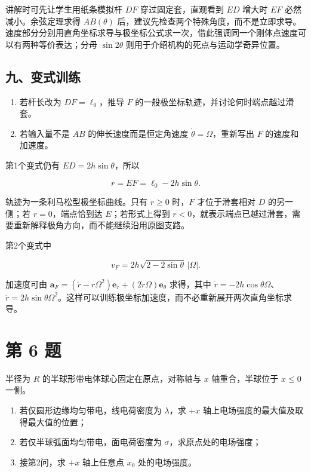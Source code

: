 \documentclass[12pt,a4paper,UTF8]{ctexart}
\newcommand{\tightlist}{\setlength{\itemsep}{0pt}\setlength{\parskip}{0pt}}
\begin{document}
讲解时可先让学生用纸条模拟杆 \(DF\) 穿过固定套，直观看到 \(ED\) 增大时
\(EF\) 必然减小。余弦定理求得 \(AB(\theta)\)
后，建议先检查两个特殊角度，而不是立即求导。速度部分分别用直角坐标求导与极坐标公式求一次，借此强调同一个刚体点速度可以有两种等价表达；分母
\(\sin2\theta\) 则用于介绍机构的死点与运动学奇异位置。

\subsection{九、变式训练}\label{ux4e5dux53d8ux5f0fux8badux7ec3-4}

\begin{enumerate}
\def\labelenumi{\arabic{enumi}.}
\tightlist
\item
  若杆长改为 \(DF=\ell_0\)，推导 \(F\)
  的一般极坐标轨迹，并讨论何时端点越过滑套。
\item
  若输入量不是 \(AB\) 的伸长速度而是恒定角速度
  \(\dot\theta=\Omega\)，重新写出 \(F\) 的速度和加速度。
\end{enumerate}

第1个变式仍有 \(ED=2h\sin\theta\)，所以

\[
r=EF=\ell_0-2h\sin\theta.
\]

轨迹为一条利马松型极坐标曲线。只有 \(r\ge0\) 时，\(F\) 才位于滑套相对
\(D\) 的另一侧；若 \(r=0\)，端点恰到达 \(E\)；若形式上得到
\(r<0\)，就表示端点已越过滑套，需要重新解释极角方向，而不能继续沿用原图支路。

第2个变式中

\[
v_F=2h\sqrt{2-2\sin\theta}\,|\Omega|.
\]

加速度可由
\(\bm a_F=(\ddot r-r\Omega^2)\bm e_r+(2\dot r\Omega)\bm e_\theta\)
求得，其中
\(\dot r=-2h\cos\theta\Omega\)、\(\ddot r=2h\sin\theta\Omega^2\)。这样可以训练极坐标加速度，而不必重新展开两次直角坐标求导。

\newpage

\section{第 6 题}\label{ux7b2c-6-ux9898}

半径为 \(R\) 的半球形带电体球心固定在原点，对称轴与 \(x\)
轴重合，半球位于 \(x\le0\) 一侧。

\begin{enumerate}
\def\labelenumi{\arabic{enumi}.}
\tightlist
\item
  若仅圆形边缘均匀带电，线电荷密度为 \(\lambda\)，求 \(+x\)
  轴上电场强度的最大值及取得最大值的位置；
\item
  若仅半球弧面均匀带电，面电荷密度为 \(\sigma\)，求原点处的电场强度；
\item
  接第2问，求 \(+x\) 轴上任意点 \(x_0\) 处的电场强度。
\end{enumerate}
\end{document}
